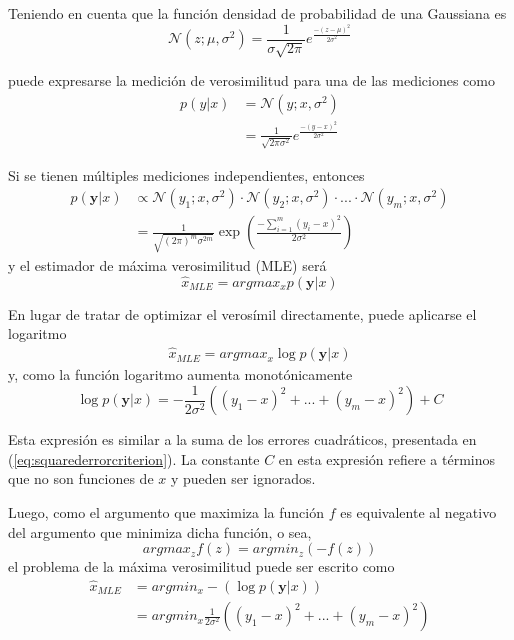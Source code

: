 Teniendo en cuenta que la función densidad de probabilidad de una Gaussiana es
\begin{equation}
    \mathcal{N}(z;\mu,\sigma^2) = \frac{1}{\sigma \sqrt{2\pi}} e^{\frac{-(z-\mu)^2}{2\sigma^2}}
\end{equation}

puede expresarse la medición de verosimilitud para una de las mediciones como
\begin{align}
    p(y|x) &= \mathscr{N}(y;x,\sigma^2) \\
           &= \frac{1}{\sqrt{2\pi\sigma^2}} e^{\frac{-(y-x)^2}{2\sigma^2}}
\end{align}

Si se tienen múltiples mediciones independientes, entonces
\begin{align}
    p(\bm{y}|x) &\propto \mathscr{N}(y_1;x,\sigma^2)\cdot\mathscr{N}(y_2;x,\sigma^2)\cdot...\cdot\mathscr{N}(y_m;x,\sigma^2) \\
            &= \frac{1}{\sqrt{(2\pi)^m\sigma^{2m}}} \exp\left({\frac{-\sum_{i=1}^m(y_i-x)^2}{2\sigma^2}}\right)
\end{align}
y el estimador de máxima verosimilitud (MLE) será
\begin{equation}
    \hat{x}_{MLE} = argmax_x p(\bm{y}|x)
\end{equation}

En lugar de tratar de optimizar el verosímil directamente, puede aplicarse el logaritmo
\begin{align}
    \hat{x}_{MLE} = argmax_x \log p(\bm{y}|x)
\end{align}
y, como la función logaritmo aumenta monotónicamente
\begin{equation}
    \log p(\bm{y}|x) = -\frac{1}{2\sigma^2}\left((y_1-x)^2+...+(y_m-x)^2\right)+C
\end{equation}

Esta expresión es similar a la suma de los errores cuadráticos, presentada en (\ref{eq:squarederrorcriterion}). La constante $C$ en esta expresión refiere a términos que no son funciones de $x$ y pueden ser ignorados.

Luego, como el argumento que maximiza la función $f$ es equivalente al negativo del argumento que minimiza dicha función, o sea,
\begin{equation}
    argmax_z f(z) = argmin_z \left(-f(z)\right)
\end{equation}
el problema de la máxima verosimilitud puede ser escrito como
\begin{align}
    \hat{x}_{MLE} &= argmin_x -\left(\log p(\bm{y}|x)\right) \\
                  &= argmin_x \frac{1}{2\sigma^2}\left((y_1-x)^2+...+(y_m-x)^2\right)
\end{align}

